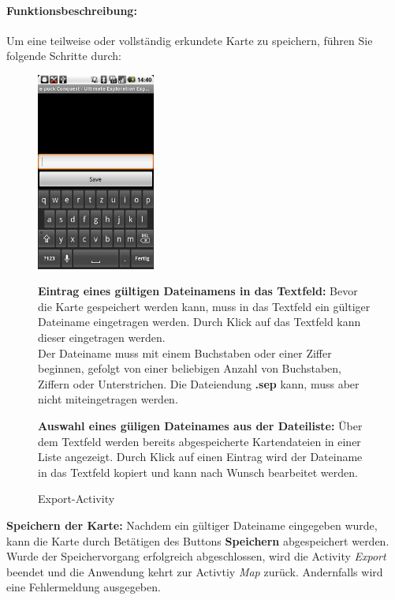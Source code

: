 \documentclass[10pt,a4paper]{article}
\begin{document}
 		\paragraph*{Funktionsbeschreibung:}
 		Um eine teilweise oder vollständig erkundete Karte zu speichern, führen Sie folgende Schritte durch:
 		\begin{enumerate}
 		
 		\begin{figure}[htbp]
				\begin{minipage}[t]{6.5cm}
					\vspace{20pt}
					\includegraphics[height=6.5cm]{images/export.png} 
					\caption{Export-Activity}
				\end{minipage}
				\hfill
				\begin{minipage}[t]{0.5\textwidth}
					\vspace{10pt}
					\item \textbf{Eintrag eines gültigen Dateinamens in das Textfeld:} Bevor die Karte gespeichert werden kann, muss in das Textfeld ein
 					gültiger Dateiname eingetragen werden. Durch Klick auf das Textfeld kann dieser eingetragen werden. \\ 
 					Der Dateiname muss mit einem Buchstaben oder einer Ziffer beginnen, gefolgt von einer beliebigen Anzahl von Buchstaben, Ziffern oder
 					Unterstrichen. Die Dateiendung \textbf{.sep} kann, muss aber nicht miteingetragen werden.
 					\item \textbf{Auswahl eines güligen Dateinames aus der Dateiliste:} Über dem Textfeld werden bereits abgespeicherte Kartendateien in
 					einer Liste angezeigt. Durch Klick auf einen Eintrag wird der Dateiname in das Textfeld kopiert und kann nach Wunsch bearbeitet werden.
				\end{minipage}
   			\end{figure} 	
 			
 			\item \textbf{Speichern der Karte:} Nachdem ein gültiger Dateiname eingegeben wurde, kann die Karte durch Betätigen des Buttons
 			\textbf{Speichern} abgespeichert werden. Wurde der Speichervorgang erfolgreich abgeschlossen, wird die Activity \textit{Export} beendet
 			und die Anwendung kehrt zur Activtiy \textit{Map} zurück. Andernfalls wird eine Fehlermeldung ausgegeben.
 		\end{enumerate}
 	
\end{document}
